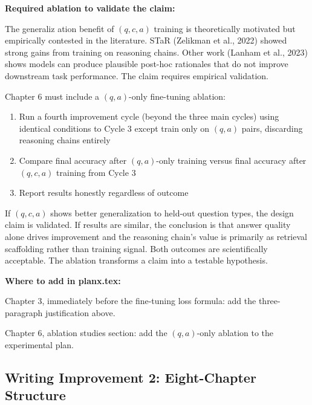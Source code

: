 \documentclass[11pt,a4paper]{article}
\begin{document}
{\textbf{Required ablation to validate the claim:}

The generaliz ation benefit of $(q,c,a)$ training is theoretically motivated but empirically contested in the literature. STaR (Zelikman et al., 2022) showed strong gains from training on reasoning chains. Other work (Lanham et al., 2023) shows models can produce plausible post-hoc rationales that do not improve downstream task performance. The claim requires empirical validation.

Chapter 6 must include a $(q,a)$-only fine-tuning ablation:
\begin{enumerate}
\item Run a fourth improvement cycle (beyond the three main cycles) using identical conditions to Cycle 3 except train only on $(q,a)$ pairs, discarding reasoning chains entirely
\item Compare final accuracy after $(q,a)$-only training versus final accuracy after $(q,c,a)$ training from Cycle 3
\item Report results honestly regardless of outcome
\end{enumerate}

If $(q,c,a)$ shows better generalization to held-out question types, the design claim is validated. If results are similar, the conclusion is that answer quality alone drives improvement and the reasoning chain's value is primarily as retrieval scaffolding rather than training signal. Both outcomes are scientifically acceptable. The ablation transforms a claim into a testable hypothesis.

\textbf{Where to add in planx.tex:}

Chapter 3, immediately before the fine-tuning loss formula: add the three-paragraph justification above.

Chapter 6, ablation studies section: add the $(q,a)$-only ablation to the experimental plan.
}

\subsection{Writing Improvement 2: Eight-Chapter Structure}
\end{document}

